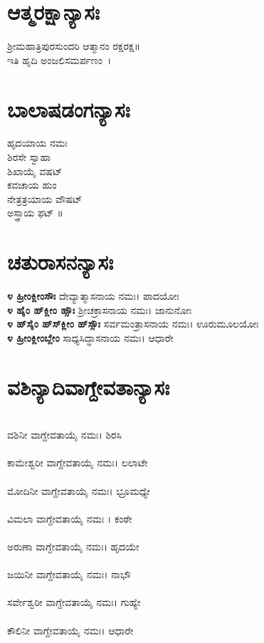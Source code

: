 \section{ಆತ್ಮರಕ್ಷಾನ್ಯಾಸಃ}
 ಶ್ರೀಮಹಾತ್ರಿಪುರಸುಂದರಿ ಆತ್ಮಾನಂ ರಕ್ಷರಕ್ಷ॥\\ಇತಿ ಹೃದಿ ಅಂಜಲಿಸಮರ್ಪಣಂ~।
\section{ಬಾಲಾಷಡಂಗನ್ಯಾಸಃ}
 ಹೃದಯಾಯ ನಮಃ\\
 ಶಿರಸೇ ಸ್ವಾಹಾ\\
ಶಿಖಾಯೈ ವಷಟ್\\
 ಕವಚಾಯ ಹುಂ\\
ನೇತ್ರತ್ರಯಾಯ ವೌಷಟ್\\
 ಅಸ್ತ್ರಾಯ ಫಟ್ ॥
\section{ಚತುರಾಸನನ್ಯಾಸಃ}
{\bfseries ೪ ಹ್ರೀಂಕ್ಲೀಂಸೌಃ }ದೇವ್ಯಾತ್ಮಾಸನಾಯ ನಮಃ। ಪಾದಯೋಃ\\
{\bfseries ೪ ಹೈಂ ಹ್‌ಕ್ಲೀಂ ಹ್ಸೌಃ} ಶ್ರೀಚಕ್ರಾಸನಾಯ ನಮಃ। ಜಾನುನೋಃ\\
{\bfseries ೪ ಹ್‌ಸೈಂ ಹ್‌ಸ್‌ಕ್ಲೀಂ ಹ್‌ಸ್ಸೌಃ} ಸರ್ವಮಂತ್ರಾಸನಾಯ ನಮಃ। ಊರುಮೂಲಯೋಃ\\
{\bfseries ೪ ಹ್ರೀಂಕ್ಲೀಂಬ್ಲೇಂ} ಸಾಧ್ಯಸಿದ್ಧಾಸನಾಯ ನಮಃ। ಆಧಾರೇ
\section{ವಶಿನ್ಯಾದಿವಾಗ್ದೇವತಾನ್ಯಾಸಃ}
\\ ವಶಿನೀ ವಾಗ್ದೇವತಾಯೈ ನಮಃ। ಶಿರಸಿ\\
\\ ಕಾಮೇಶ್ವರೀ ವಾಗ್ದೇವತಾಯೈ ನಮಃ। ಲಲಾಟೇ\\
\\ ಮೋದಿನೀ ವಾಗ್ದೇವತಾಯೈ ನಮಃ। ಭ್ರೂಮಧ್ಯೇ\\
\\ ವಿಮಲಾ ವಾಗ್ದೇವತಾಯೈ ನಮಃ । ಕಂಠೇ\\
\\ ಅರುಣಾ ವಾಗ್ದೇವತಾಯೈ ನಮಃ। ಹೃದಯೇ\\
\\ ಜಯಿನೀ ವಾಗ್ದೇವತಾಯೈ ನಮಃ। ನಾಭೌ\\
\\ ಸರ್ವೇಶ್ವರೀ ವಾಗ್ದೇವತಾಯೈ ನಮಃ। ಗುಹ್ಯೇ\\
\\ ಕೌಲಿನೀ ವಾಗ್ದೇವತಾಯೈ ನಮಃ। ಆಧಾರೇ
